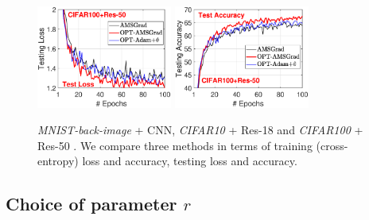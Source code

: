 \documentclass[twoside]{article}
\begin{document}
\begin{figure}
{\includegraphics[width=1.75in]{new_figure/cifar100_test_loss_disz.eps}\hspace{-0.12in}
\includegraphics[width=1.75in]{new_figure/cifar100_test_acc_disz.eps}
}

\caption{\textit{MNIST-back-image} + CNN, \textit{CIFAR10} + Res-18 and \textit{CIFAR100} + Res-50 . We compare three methods in terms of training (cross-entropy) loss and accuracy, testing loss and accuracy.} \label{fig:testandtrain}\vspace{-0.15in}
\end{figure}

\subsection{Choice of parameter $r$}\label{sec:choicer}
\end{document}

